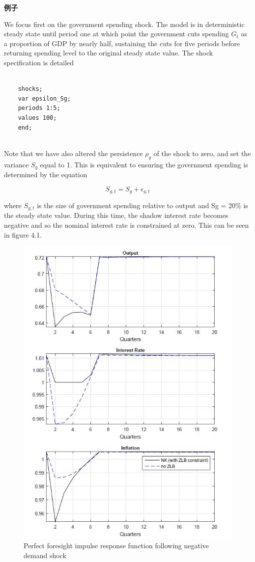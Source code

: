 \documentclass[cn,10pt,math=newtx,citestyle=gb7714-2015,bibstyle=gb7714-2015]{elegantbook}
\begin{document}
\textbf{例子}

We focus first on the government spending shock. The model is in deterministic steady state until period one at which point the government cuts spending $G_t$ as a proportion of GDP by nearly half, sustaining the cuts for five periods before returning spending level to the original steady state value. The shock
specification is detailed

\begin{lstlisting}[frame=shadowbox]
	
	shocks;
	var epsilon_Sg;
	periods 1:5;
	values 100;
	end;
	
\end{lstlisting}

Note that we have also altered the persistence $\rho_g$ of the shock to zero, and set the variance $S_g$ equal to 1. This is
equivalent to ensuring the government spending is determined by the equation

$$S_{g,t}=S_g+\epsilon_{g,t}$$

where $S_{g,t}$ is the size of government spending relative to output and Sg = 20\% is the steady state value. During this time, the shadow interest rate becomes negative and so the nominal interest rate is constrained at zero. This can be
seen in figure 4.1.

\begin{figure}[htbp!]
	\centering
	\includegraphics[width=0.8\linewidth]{FIG/simul}
	\caption{Perfect foresight impulse response function following negative demand shock}\label{4.1}
	\centering
\end{figure}
\end{document}
